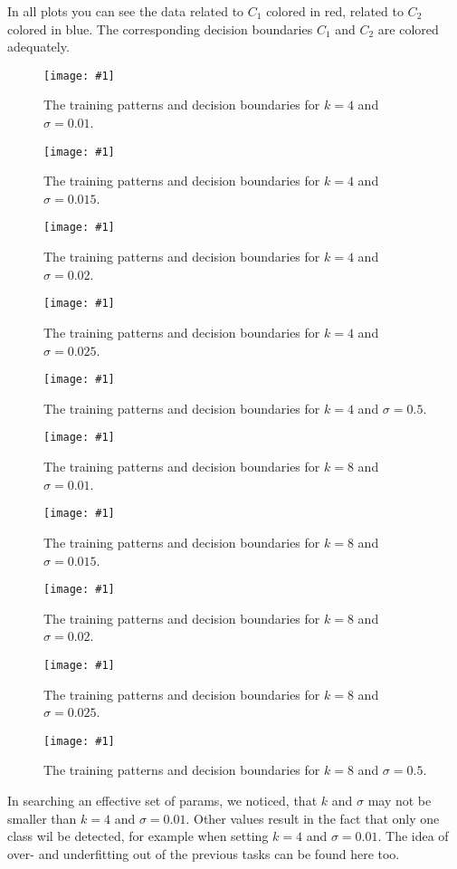\documentclass[a4paper,headings=small]{scrartcl}
\newcommand{\image}[3]{
\begin{figure}[htbp]
\centering
\texttt{[image: \#1]}
\caption{#3}
\label{fig:#1}
\end{figure}
}
\begin{document}
In all plots you can see the data related to $C_1$ colored in red, related to $C_2$ colored in blue.
The corresponding decision boundaries $C_1$ and $C_2$ are colored adequately.

\image{out_classifierRbf_k_4_sigma_001}{\classifierPlotWidth}%
	{The training patterns and decision boundaries for $k = 4$ and $\sigma = 0.01$.}

\image{out_classifierRbf_k_4_sigma_0015}{\classifierPlotWidth}%
	{The training patterns and decision boundaries for $k = 4$ and $\sigma = 0.015$.}

\image{out_classifierRbf_k_4_sigma_002}{\classifierPlotWidth}%
	{The training patterns and decision boundaries for $k = 4$ and $\sigma = 0.02$.}

\image{out_classifierRbf_k_4_sigma_0025}{\classifierPlotWidth}%
	{The training patterns and decision boundaries for $k = 4$ and $\sigma = 0.025$.}

\image{out_classifierRbf_k_4_sigma_05}{\classifierPlotWidth}%
	{The training patterns and decision boundaries for $k = 4$ and $\sigma = 0.5$.}

\image{out_classifierRbf_k_8_sigma_001}{\classifierPlotWidth}%
	{The training patterns and decision boundaries for $k = 8$ and $\sigma = 0.01$.}

\image{out_classifierRbf_k_8_sigma_0015}{\classifierPlotWidth}%
	{The training patterns and decision boundaries for $k = 8$ and $\sigma = 0.015$.}

\image{out_classifierRbf_k_8_sigma_002}{\classifierPlotWidth}%
	{The training patterns and decision boundaries for $k = 8$ and $\sigma = 0.02$.}

\image{out_classifierRbf_k_8_sigma_0025}{\classifierPlotWidth}%
	{The training patterns and decision boundaries for $k = 8$ and $\sigma = 0.025$.}

\image{out_classifierRbf_k_8_sigma_05}{\classifierPlotWidth}%
	{The training patterns and decision boundaries for $k = 8$ and $\sigma = 0.5$.}


In searching an effective set of params, we noticed, that $k$ and $\sigma$ may not be smaller than $k=4$ and $\sigma = 0.01$.
Other values result in the fact that only one class wil be detected,
for example when setting $k = 4$ and $\sigma = 0.01$.
The idea of over- and underfitting out of the previous tasks can be found here too.
\end{document}
